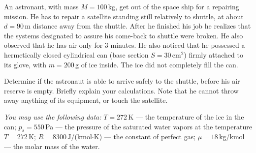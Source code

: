 An astronaut, with mass $M = 100$\,kg, get out of the space ship for a
repairing mission. He has to repair a satellite standing still relatively to
shuttle, at about $d = 90$\,m distance away from the shuttle. After he finished
his job he realizes that the systems designated to assure his come-back to
shuttle were broken. He also observed that he has air only for 3 minutes. He
also noticed that he possessed a hermetically closed cylindrical can (base
section $S = 30\,\mathrm{cm}^2$) firmly attached to its glove, with
$m = 200$\,g of ice inside. The ice did not completely fill the can.

Determine if the astronaut is able to arrive safely to the shuttle, before his
air reserve is empty. Briefly explain your calculations. Note that he cannot
throw away anything of its equipment, or touch the satellite.

\emph{You may use the following data:} $T = 272$\,K --- the temperature of the
ice in the can; $p_s = 550$\,Pa --- the pressure of the saturated water vapors
at the temperature $T = 272$\,K; $R = 8300$\,J/(kmol$\cdot$K) --- the constant
of perfect gas; $\mu = 18$\,kg/kmol --- the molar mass of the water.
